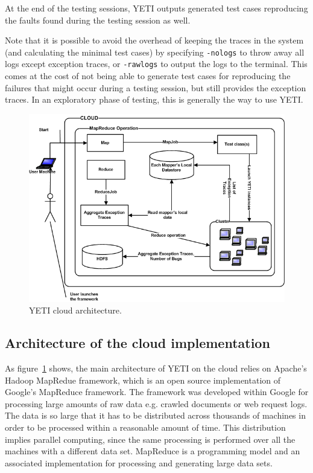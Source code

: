 \documentclass [a4paper, 11pt, twoside] {report}
\begin{document}
At the end of the testing sessions, YETI outputs generated test cases reproducing 
the faults found during the testing session as well.

Note that it is possible to avoid the overhead of keeping the 
traces in the system (and calculating the minimal test cases) by specifying 
\texttt{-nologs} to throw away all logs except exception traces, or 
\texttt{-rawlogs} to output the logs to the terminal. This comes at the cost of
not being able to generate test cases for reproducing the failures that might occur during a testing session, but still provides the exception traces. In an exploratory phase of testing, this is generally the
way to use YETI.

\begin{figure}[h]
\begin{center}
\includegraphics[width=\columnwidth]{images/YetiCloud.png}
\end{center}
\caption{YETI cloud architecture.}\label{fig:architecture}
\end{figure}


\subsection{Architecture of the cloud implementation}

As figure~\ref{fig:architecture} shows, the main architecture of YETI on the cloud 
relies on Apache's Hadoop MapRedue framework,  which is an open source implementation of Google's MapReduce framework. The framework was developed within Google for processing large amounts of raw data e.g. crawled documents or web request logs. The data is so large that it has to be distributed across thousands of machines in order to be processed within a reasonable amount of time. This distribution implies parallel computing, since the same processing is performed over all the machines with a different data set. MapReduce is a programming model and an associated implementation for processing and generating large data sets. 
\end{document}
